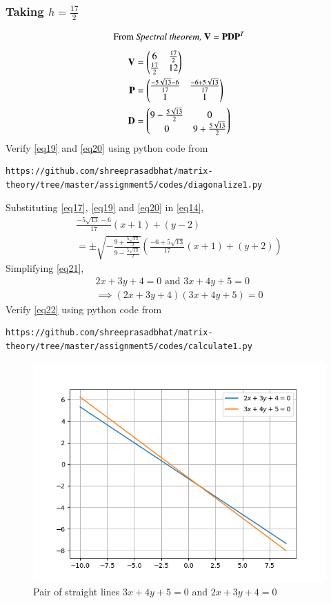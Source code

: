 \documentclass[journal,12pt,twocolumn]{IEEEtran}
\begin{document}
\subsubsection{Taking $h=\frac{17}{2}$}
\begin{equation}
	\text{From \textit{Spectral theorem, }}\vec{V} = \vec{P}\vec{D}\vec{P}^T
\end{equation}
\begin{align}
	\label{eq18}\vec{V} &= \myvec{ 6 & \frac{17}{2}\\ \frac{17}{2} & 12}\\
	\label{eq19}\vec{P} &= \myvec{\frac{-5\sqrt{13} - 6}{17} & \frac{-6 + 5\sqrt{13}}{17}\\ 1 & 1}\\
	\label{eq20}\vec{D} &= \myvec{9 - \frac{5\sqrt{13}}{2} & 0\\ 0 & 9 + \frac{5\sqrt{13}}{2}}
\end{align}
Verify  \eqref{eq19} and \eqref{eq20} using python code from
\begin{lstlisting}
https://github.com/shreeprasadbhat/matrix-theory/tree/master/assignment5/codes/diagonalize1.py
\end{lstlisting}
Substituting \eqref{eq17}, \eqref{eq19} and \eqref{eq20} in \eqref{eq14},
\begin{multline}\label{eq21}
	\frac{-5\sqrt{13} - 6}{17}(x+1) + (y-2) \\= \pm \sqrt{-\frac{9 + \frac{5\sqrt{13}}{2}}{9 - \frac{5\sqrt{13}}{2}}}\left(\frac{-6 + 5\sqrt{13}}{17}(x+1) + (y+2)\right)
\end{multline}
Simplifying \eqref{eq21},
\begin{align}
	\label{eq22}2x + 3y + 4 = 0 \text{ and } 3x + 4y + 5 = 0\\
	\implies (2x + 3y + 4)(3x + 4y + 5) = 0
\end{align}
Verify  \eqref{eq22} using python code from
\begin{lstlisting}
https://github.com/shreeprasadbhat/matrix-theory/tree/master/assignment5/codes/calculate1.py
\end{lstlisting}
\renewcommand{\thefigure}{1}
\begin{figure}[h]
	\centering
	\includegraphics[width=\columnwidth]{fig/figure_1.png}
	\caption{Pair of straight lines $3x + 4y + 5 = 0$ and $2x + 3y + 4 = 0$}
	\label{fig:figure1}
\end{figure}
\end{document}
